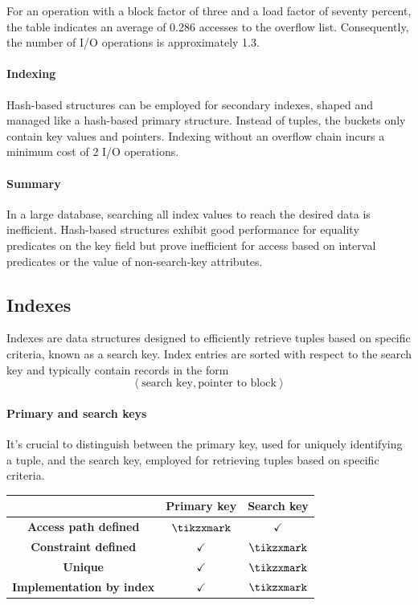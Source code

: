 \begin{example}
    For an operation with a block factor of three and a load factor of seventy percent, the table indicates an average of 0.286 accesses to the overflow list. 
    Consequently, the number of I/O operations is approximately 1.3.
\end{example} 

\paragraph*{Indexing}
Hash-based structures can be employed for secondary indexes, shaped and managed like a hash-based primary structure. 
Instead of tuples, the buckets only contain key values and pointers.
Indexing without an overflow chain incurs a minimum cost of 2 I/O operations.

\paragraph*{Summary}
In a large database, searching all index values to reach the desired data is inefficient. 
Hash-based structures exhibit good performance for equality predicates on the key field but prove inefficient for access based on interval predicates or the value of non-search-key attributes.

\subsection{Indexes}
Indexes are data structures designed to efficiently retrieve tuples based on specific criteria, known as a search key.
Index entries are sorted with respect to the search key and typically contain records in the form 
\[\left\langle \text{search key}, \text{pointer to block}\right\rangle \]

\paragraph*{Primary and search keys}
It's crucial to distinguish between the primary key, used for uniquely identifying a tuple, and the search key, employed for retrieving tuples based on specific criteria.
\begin{table}[H]
    \centering
    \begin{tabular}{c|cc|}
    \cline{2-3}
                                                           & \textbf{Primary key} & \textbf{Search key} \\ \hline
    \multicolumn{1}{|c|}{\textbf{Access path defined}}     & $\tikzxmark$         & $\checkmark$        \\
    \multicolumn{1}{|c|}{\textbf{Constraint defined}}      & $\checkmark$         & $\tikzxmark$        \\
    \multicolumn{1}{|c|}{\textbf{Unique}}                  & $\checkmark$         & $\tikzxmark$        \\
    \multicolumn{1}{|c|}{\textbf{Implementation by index}} & $\checkmark$         & $\tikzxmark$        \\ \hline
    \end{tabular}
\end{table}

